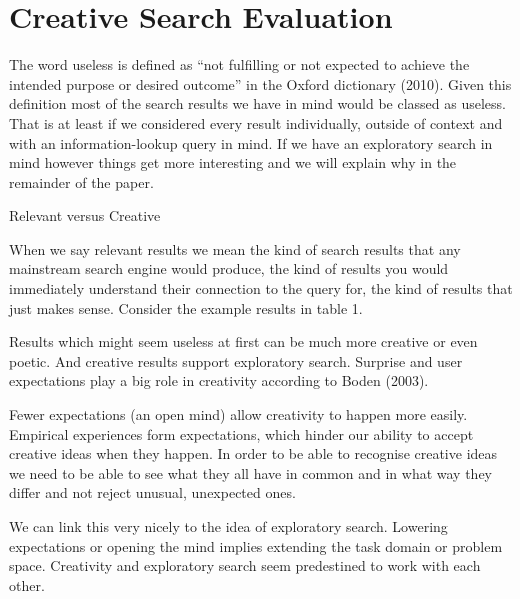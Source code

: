 \section{Creative Search Evaluation}


\begin{leftbar}
The word useless is defined as ``not fulfilling or not expected to achieve the intended purpose or desired outcome'' in the Oxford dictionary (2010). Given this definition most of the search results we have in mind would be classed as useless. That is at least if we considered every result individually, outside of context and with an information-lookup query in mind. If we have an exploratory search in mind however things get more interesting and we will explain why in the remainder of the paper.
\end{leftbar}

Relevant versus Creative

\begin{leftbar}
When we say relevant results we mean the kind of search results that any mainstream search engine would produce, the kind of results you would immediately understand their connection to the query for, the kind of results that just makes sense. Consider the example results in table 1.
\end{leftbar}

\begin{leftbar}
Results which might seem useless at first can be much more creative or even poetic. And creative results support exploratory search. Surprise and user expectations play a big role in creativity according to Boden (2003).
\end{leftbar}

\begin{leftbar}
Fewer expectations (an open mind) allow creativity to happen more easily. Empirical experiences form expectations, which hinder our ability to accept creative ideas when they happen. In order to be able to recognise creative ideas we need to be able to see what they all have in common and in what way they differ and not reject unusual, unexpected ones.
\end{leftbar}

\begin{leftbar}
We can link this very nicely to the idea of exploratory search. Lowering expectations or opening the mind implies extending the task domain or problem space. Creativity and exploratory search seem predestined to work with each other.
\end{leftbar}

